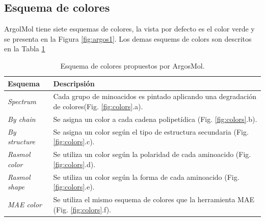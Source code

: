 \documentclass{article}
\begin{document}
\subsection{Esquema de colores}

ArgolMol tiene siete esquemas de colores, la vista por defecto es el color verde y se presenta en la Figura \ref{fig:argos1}. 
Los demas esquems de colors son descritos en la Tabla \ref{tab:color}

\begin{table}

	\begin{tabular}{p{2.1cm} p{12.6cm}}
		\textbf{Esquema} & \textbf{Descripsión}   \\
		\hline 
		\textit{Spectrum} & Cada grupo de minoacidos es pintado aplicando una degradación de colores(Fig. \ref{fig:colors}.a). \\
		\textit{By chain} & Se asigna un color a cada cadena polipetídica (Fig. \ref{fig:colors}.b). \\
		\textit{By structure} & Se asigna un color según el tipo de estructura secundaria (Fig. \ref{fig:colors}.c). \\
		\textit{Rasmol color} & Se utiliza un color según la polaridad de cada aminoacido (Fig. \ref{fig:colors}.d). \\
		\textit{Rasmol shape} & Se utiliza un color según la forma de cada aminoacido (Fig. \ref{fig:colors}.e). \\
		\textit{MAE color} & Se utiliza el mismo esquema de colores que la herramienta MAE (Fig. \ref{fig:colors}.f). \\
		\hline
	\end{tabular}
\caption{Esquema de colores propuestos por ArgosMol.}
\label{tab:color}
\end{table}	
\end{document}
